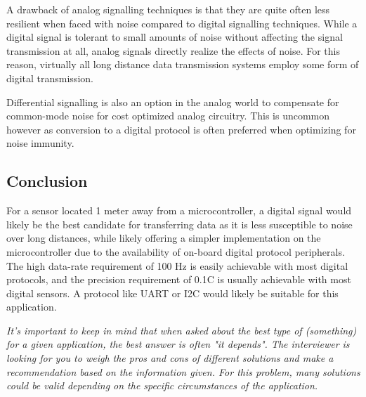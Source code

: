 \documentclass[main.tex]{subfiles}
\begin{document}
\noindent A drawback of analog signalling techniques is that they are quite often less resilient when faced with noise compared to digital signalling techniques. While a digital signal is tolerant to small amounts of noise without affecting the signal transmission at all, analog signals directly realize the effects of noise. For this reason, virtually all long distance data transmission systems employ some form of digital transmission. \newline

\newnoindentpara Differential signalling is also an option in the analog world to compensate for common-mode noise for cost optimized analog circuitry. This is uncommon however as conversion to a digital protocol is often preferred when optimizing for noise immunity. 

\subsection{Conclusion}

\noindent For a sensor located 1 meter away from a microcontroller, a digital signal would likely be the best candidate for transferring data as it is less susceptible to noise over long distances, while likely offering a simpler implementation on the microcontroller due to the availability of on-board digital protocol peripherals. The high data-rate requirement of 100 Hz is easily achievable with most digital protocols, and the precision requirement of 0.1C is usually achievable with most digital sensors. A protocol like UART or I2C would likely be suitable for this application. \newline

\newnoindentpara \textit{It's important to keep in mind that when asked about the best type of (something) for a given application, the best answer is often "it depends". The interviewer is looking for you to weigh the pros and cons of different solutions and make a recommendation based on the information given. For this problem, many solutions could be valid depending on the specific circumstances of the application.}
\end{document}
